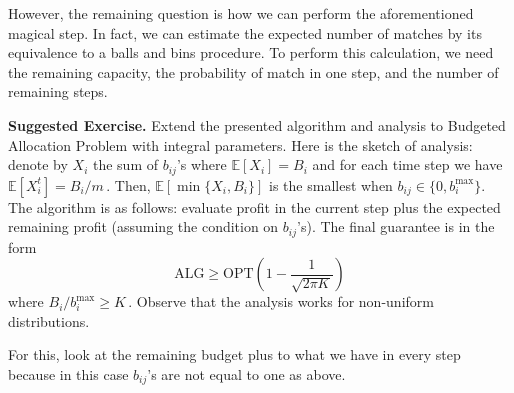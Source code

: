 \documentclass[lecture,11pt,]{pcms-l}
\numberwithin{equation}{section}
\theoremstyle{plain}
\theoremstyle{definition}
\newcommand{\para}[1]{{\bf\noindent#1}}
\newcommand{\E}{\mathbb{E}}
\newcommand{\B}{B}
\newcommand{\opt}{\mathrm{OPT}}
\newcommand{\alg}{\textrm{ALG}}
\begin{document}
However, the remaining question is how we can perform the aforementioned magical step. In fact, we can estimate the expected number of matches by its equivalence to a balls and bins procedure. To perform this calculation, we need the remaining capacity, the probability of match in one step, and the number of remaining steps. \medskip


\para{Suggested Exercise.} Extend the presented algorithm and analysis to Budgeted Allocation Problem with integral parameters. Here is the sketch of analysis: denote by $X_i$ the sum of $b_{ij}$'s where $\E[X_i] = \B_i$ and for each time step we have $\E[X_i^t] = \B_i/m\,$. Then, $\E[\min\{X_i, \B_i\}]$ is the smallest when $b_{ij} \in \{0,b_i^{\text{max}}\}$. The algorithm is as follows: evaluate profit in the current step plus the expected remaining profit (assuming the condition on $b_{ij}$'s). The final guarantee is in the form
\[
\alg \geq \opt (1-\frac{1}{\sqrt{2\pi K}})
\] 
where $\B_i / b_i^{\text{max}}\geq K\,$. Observe that the analysis works for non-uniform distributions. 

For this, look at the remaining budget plus to what we have in every step because in this case $b_{ij}$'s are not equal to one as above. 
\end{document}
